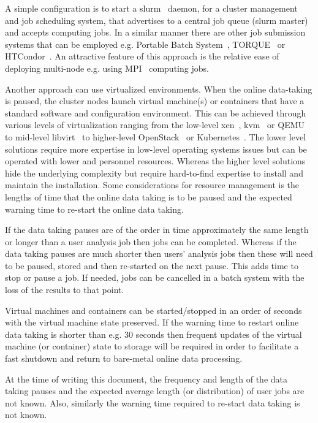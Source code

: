 \documentclass[12pt,a4paper]{article}
\begin{document}
A simple configuration is to start a slurm~\cite{slurm} daemon, for a cluster management and job scheduling system, that advertises to a central job queue (slurm master) and accepts computing jobs.
In a similar manner there are other job submission systems that can be employed e.g. Portable Batch System~\cite{pbs}, TORQUE~\cite{torque} or HTCondor~\cite{htcondor}.
An attractive feature of this approach is the relative ease of deploying multi-node e.g. using MPI~\cite{mpi} computing jobs.

Another approach can use virtualized environments.
When the online data-taking is paused, the cluster nodes launch virtual machine(s) or containers that have a standard \ED software and configuration environment.
This can be achieved through various levels of virtualization ranging from the low-level xen~\cite{xen}, kvm~\cite{kvm} or QEMU~\cite{qemu} to mid-level libvirt~\cite{libvirt} to higher-level OpenStack~\cite{openstack} or Kubernetes~\cite{kubernetes}.
The lower level solutions require more expertise in low-level operating systems issues but can be operated with lower \einfra and personnel resources.
Whereas the higher level solutions hide the underlying complexity but require hard-to-find expertise to install and maintain the installation.
Some considerations for resource management is the lengths of time that the online data taking is to be paused and the expected warning time to re-start the online data taking.

If the data taking pauses are of the order in time approximately the same length or longer than a user analysis job then jobs can be completed. 
Whereas if the data taking pauses are much shorter then users' analysis jobs then these will need to be paused, stored and then re-started on the next pause.
This adds time to stop or pause a job.
If needed, jobs can be cancelled in a batch system with the loss of the results to that point.

Virtual machines and containers can be started/stopped in an order of seconds with the virtual machine state preserved.
If the warning time to restart online data taking is shorter than e.g. 30 seconds then frequent updates of the virtual machine (or container) state to storage will be required in order to facilitate a fast shutdown and return to bare-metal online data processing.

At the time of writing this document, the frequency and length of the data taking pauses and the expected average length (or distribution) of user jobs are not known.
Also, similarly the warning time required to re-start data taking is not known.
\end{document}
